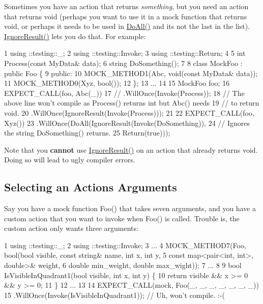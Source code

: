 Sometimes you have an action that returns {\itshape something}, but you need an action that returns {\ttfamily void} (perhaps you want to use it in a mock function that returns {\ttfamily void}, or perhaps it needs to be used in {\ttfamily \hyperlink{namespacetesting_a5f533932753d2af95000e96c4a3042e3}{Do\+All()}} and it\textquotesingle{}s not the last in the list). {\ttfamily \hyperlink{namespacetesting_a50ae42540a31047c7fddd32df8d835f5}{Ignore\+Result()}} lets you do that. For example\+:


\begin{DoxyCode}
1 using ::testing::\_;
2 using ::testing::Invoke;
3 using ::testing::Return;
4 
5 int Process(const MyData& data);
6 string DoSomething();
7 
8 class MockFoo : public Foo \{
9  public:
10   MOCK\_METHOD1(Abc, void(const MyData& data));
11   MOCK\_METHOD0(Xyz, bool());
12 \};
13 ...
14 
15   MockFoo foo;
16   EXPECT\_CALL(foo, Abc(\_))
17   // .WillOnce(Invoke(Process));
18   // The above line won't compile as Process() returns int but Abc() needs
19   // to return void.
20       .WillOnce(IgnoreResult(Invoke(Process)));
21 
22   EXPECT\_CALL(foo, Xyz())
23       .WillOnce(DoAll(IgnoreResult(Invoke(DoSomething)),
24       // Ignores the string DoSomething() returns.
25                       Return(true)));
\end{DoxyCode}


Note that you {\bfseries cannot} use {\ttfamily \hyperlink{namespacetesting_a50ae42540a31047c7fddd32df8d835f5}{Ignore\+Result()}} on an action that already returns {\ttfamily void}. Doing so will lead to ugly compiler errors.

\subsection*{Selecting an Action\textquotesingle{}s Arguments}

Say you have a mock function {\ttfamily Foo()} that takes seven arguments, and you have a custom action that you want to invoke when {\ttfamily Foo()} is called. Trouble is, the custom action only wants three arguments\+:


\begin{DoxyCode}
1 using ::testing::\_;
2 using ::testing::Invoke;
3 ...
4   MOCK\_METHOD7(Foo, bool(bool visible, const string& name, int x, int y,
5                          const map<pair<int, int>, double>& weight,
6                          double min\_weight, double max\_wight));
7 ...
8 
9 bool IsVisibleInQuadrant1(bool visible, int x, int y) \{
10   return visible && x >= 0 && y >= 0;
11 \}
12 ...
13 
14   EXPECT\_CALL(mock, Foo(\_, \_, \_, \_, \_, \_, \_))
15       .WillOnce(Invoke(IsVisibleInQuadrant1));  // Uh, won't compile. :-(
\end{DoxyCode}


